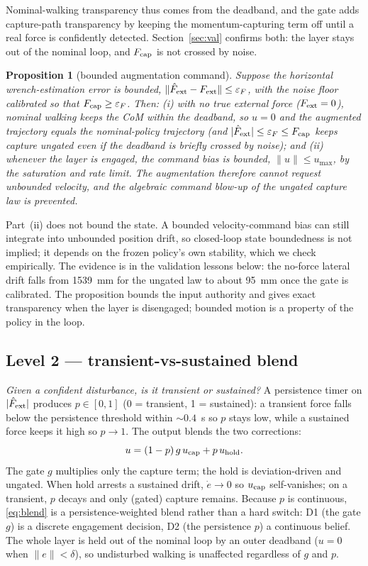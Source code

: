 \documentclass[journal]{IEEEtran}
\newtheorem{proposition}{Proposition}
\begin{document}
Nominal-walking transparency thus comes from the deadband, and the gate adds capture-path transparency by keeping the momentum-capturing term off until a real force is confidently detected. Section~\ref{sec:val} confirms both: the layer stays out of the nominal loop, and $F_{\rm cap}$ is not crossed by noise.

\begin{proposition}[bounded augmentation command]
\label{prop:bounded}
Suppose the horizontal wrench-estimation error is bounded, $\|\hat F_{\rm ext}-F_{\rm ext}\|\le\varepsilon_F$, with the noise floor calibrated so that $F_{\rm cap}\ge\varepsilon_F$. Then: (i) with no true external force ($F_{\rm ext}=0$), nominal walking keeps the CoM within the deadband, so $u=0$ and the augmented trajectory equals the nominal-policy trajectory (and $|\hat F_{\rm ext}|\le\varepsilon_F\le F_{\rm cap}$ keeps capture ungated even if the deadband is briefly crossed by noise); and (ii) whenever the layer is engaged, the command bias is bounded, $\|u\|\le u_{\max}$, by the saturation and rate limit. The augmentation therefore cannot request unbounded velocity, and the \emph{algebraic} command blow-up of the ungated capture law is prevented.
\end{proposition}

Part~(ii) does not bound the state. A bounded velocity-command bias can still integrate into unbounded position drift, so closed-loop state boundedness is not implied; it depends on the frozen policy's own stability, which we check empirically. The evidence is in the validation lessons below: the no-force lateral drift falls from 1539~mm for the ungated law to about 95~mm once the gate is calibrated. The proposition bounds the input authority and gives exact transparency when the layer is disengaged; bounded motion is a property of the policy in the loop.

\subsection{Level 2 --- transient-vs-sustained blend}
\label{sec:blend}

\emph{Given a confident disturbance, is it transient or sustained?} A persistence timer on $|\hat F_{\rm ext}|$ produces $p\in[0,1]$ (0 = transient, 1 = sustained): a transient force falls below the persistence threshold within $\sim 0.4$~s so $p$ stays low, while a sustained force keeps it high so $p\to 1$. The output blends the two corrections:
\begin{equation}
u=(1-p)\,g\,u_{\rm cap}+p\,u_{\rm hold}.
\label{eq:blend}
\end{equation}
The gate $g$ multiplies only the capture term; the hold is deviation-driven and ungated. When hold arrests a sustained drift, $\dot e\to 0$ so $u_{\rm cap}$ self-vanishes; on a transient, $p$ decays and only (gated) capture remains. Because $p$ is continuous, \eqref{eq:blend} is a persistence-weighted blend rather than a hard switch: D1 (the gate $g$) is a discrete engagement decision, D2 (the persistence $p$) a continuous belief. The whole layer is held out of the nominal loop by an outer deadband ($u=0$ when $\|e\|<\delta$), so undisturbed walking is unaffected regardless of $g$ and $p$.
\end{document}
